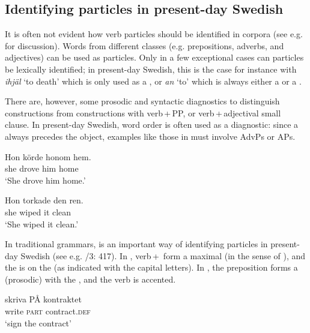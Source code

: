 \documentclass[output=paper]{langscibook}
\begin{document}
\subsection{Identifying particles in present-day Swedish}\label{sec:lalu:2.2}

It is often not evident how verb particles should be identified in corpora (see e.g. \citealt{LarssonRoxendal2020} for discussion). Words from different classes (e.g. prepositions, adverbs, and adjectives) can be used as particles. Only in a few exceptional cases can particles be lexically identified; in present-day Swedish, this is the case for instance with \textit{ihjäl} ‘to death’ which is only used as a , or \textit{an} ‘to’ which is always either a  or a .


\begin{sloppypar}
There are, however, some prosodic and syntactic diagnostics to distinguish  constructions from constructions with verb\,+\,PP, or verb\,+\,adjectival small clause. In present-day Swedish, word order is often used as a diagnostic: since a  always precedes the object, examples like those in  must involve AdvPs or APs.
\end{sloppypar}


\ea\label{ex:lalu:9}
\ea
\gll  Hon   körde   honom   hem.  \\
    she     drove   him     home\\
\glt `She drove him home.'

\ex
\gll  Hon   torkade   den   ren.\\
    she     wiped   it     clean\\
\glt `She wiped it clean.'
\z
\z

\begin{sloppypar}
In traditional grammars,  is an important way of identifying particles in present-day Swedish (see e.g. \citealt{TelemanEtAl1999}/3: 417). In , verb\,+\, form a maximal  (in the sense of \citealt{MyrbergRiad2015}), and the  is on the  (as indicated with the capital letters). In , the  preposition forms a (prosodic)  with the , and the verb is accented.
\end{sloppypar}

\ea\label{ex:lalu:10}
\ea\label{ex:lalu:10a}
\gll  skriva   PÅ   kontraktet\\
    write     \textsc{part}   contract\textsc{.def}\\
\glt `sign the contract'
\end{document}
